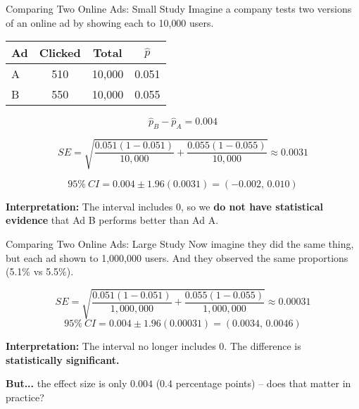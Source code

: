 \documentclass[slidestop,compress,mathserif]{beamer}
\begin{document}
\begin{frame}{Comparing Two Online Ads: Small Study}
\small
Imagine a company tests two versions of an online ad by showing each to 10{,}000 users.

\medskip
\setlength{\tabcolsep}{4pt}
\renewcommand{\arraystretch}{1.1}
\begin{tabular}{lccc}
\textbf{Ad} & Clicked & Total & \(\hat p\) \\
\hline
A & 510 & 10{,}000 & 0.051 \\
B & 550 & 10{,}000 & 0.055 \\
\end{tabular}

\medskip
\[
\hat{p}_B - \hat{p}_A = 0.004
\]

\[
SE = \sqrt{\frac{0.051(1-0.051)}{10{,}000} + \frac{0.055(1-0.055)}{10{,}000}} \approx 0.0031
\]

\[
95\%~CI = 0.004 \pm 1.96(0.0031) = (-0.002,\, 0.010)
\]

\textbf{Interpretation:} The interval includes 0, so we \textbf{do not have statistical evidence}
that Ad B performs better than Ad A.
\end{frame}


\begin{frame}{Comparing Two Online Ads: Large Study}
\small
Now imagine they did the same thing, but each ad shown to 1{,}000{,}000 users. And they observed the same proportions (5.1\% vs 5.5\%).

\medskip
\[
SE = \sqrt{\frac{0.051(1-0.051)}{1{,}000{,}000} + \frac{0.055(1-0.055)}{1{,}000{,}000}}
      \approx 0.00031
\]
\[
95\%~CI = 0.004 \pm 1.96(0.00031) = (0.0034,\, 0.0046)
\]

\textbf{Interpretation:} The interval no longer includes 0.  
The difference is \textbf{statistically significant.}

\medskip
\textbf{But...} the effect size is only \(\mathbf{0.004}\) (0.4 percentage points) --  
does that matter in practice?
\end{frame}

\end{document}
